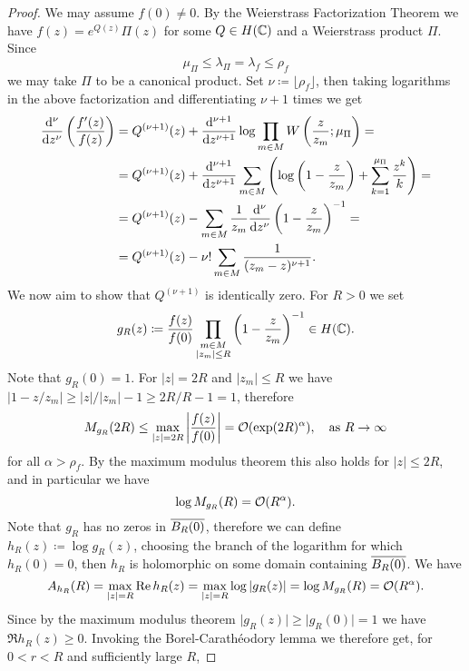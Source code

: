 \begin{proof}
    We may assume $f(0) \neq 0$. By the Weierstrass Factorization Theorem we have $f(z) = e^{Q(z)} \Pi(z)$ for some $Q \in H(\mathbb{C})$ and a Weierstrass product $\Pi$. Since
    $$ \mu_\Pi \leq \lambda_\Pi = \lambda_f \leq \rho_f $$
    we may take $\Pi$ to be a canonical product. Set $\nu \coloneqq \lfloor \rho_f \rfloor$, then taking logarithms in the above factorization and differentiating $\nu + 1$ times we get
    \begin{align*}
        \frac{\mathrm{d}^{\nu}}{\mathrm{d} {z}^{\nu}} \left( \frac{f'(z)}{f(z)} \right)
        &= Q^{(\nu+1)}(z) + \frac{\mathrm{d}^{\nu + 1}}{\mathrm{d} {z}^{\nu + 1}} \log \prod_{m \in M} W \left( \frac{z}{z_m}; \mu_\Pi \right) = \\
        &= Q^{(\nu+1)}(z) + \frac{\mathrm{d}^{\nu + 1}}{\mathrm{d} {z}^{\nu + 1}} \sum_{m \in M} \left( \log \left( 1 - \frac{z}{z_m} \right) + \sum_{k=1}^{\mu_\Pi} \frac{z^k}{k} \right) = \\
        &= Q^{(\nu+1)}(z) - \sum_{m \in M} \frac{1}{z_m} \frac{\mathrm{d}^{\nu}}{\mathrm{d} {z}^{\nu}} \left( 1 - \frac{z}{z_m} \right)^{-1} = \\
        &= Q^{(\nu+1)}(z) - \nu! \sum_{m \in M} \frac{1}{(z_m - z)^{\nu + 1}}.
    \end{align*}
    We now aim to show that $Q^{(\nu + 1)}$ is identically zero. For $R > 0$ we set
    $$ g_R(z) \coloneqq \frac{f(z)}{f(0)} \prod_{\substack{m \in M \\ \vert z_m \vert \leq R}} \left(1 - \frac{z}{z_m} \right)^{-1} \in H(\mathbb{C}). $$
    Note that $g_R(0) = 1$. For $\vert z \vert = 2R$ and $\vert z_m \vert \leq R$ we have $\vert 1 - z / z_m \vert \geq \vert z \vert / \vert z_m \vert - 1 \geq 2R/R - 1 = 1$, therefore
    $$ M_{g_R}(2R) \leq \max_{\vert z \vert = 2R} \left\vert \frac{f(z)}{f(0)} \right\vert = \mathcal{O}(\exp (2R)^\alpha), \quad \textrm{as } R \to \infty $$
    for all $\alpha > \rho_f$. By the maximum modulus theorem this also holds for $\vert z \vert \leq 2R$, and in particular we have
    $$ \log M_{g_R}(R) = \mathcal{O}(R^\alpha). $$
    Note that $g_R$ has no zeros in $\overline{B_R(0)}$, therefore we can define $h_R(z) \coloneqq \log g_R(z)$, choosing the branch of the logarithm for which $h_R(0) = 0$, then $h_R$ is holomorphic on some domain containing $\overline{B_R(0)}$. We have
    $$ A_{h_R}(R) = \max_{\vert z \vert = R} \operatorname{Re} h_R(z) = \max_{\vert z \vert = R} \log \vert g_R(z) \vert = \log M_{g_R}(R) = \mathcal{O}(R^\alpha). $$
    Since by the maximum modulus theorem $\vert g_R(z) \vert \geq \vert g_R(0) \vert = 1$ we have $\Re h_R(z) \geq 0$. Invoking the Borel-Carathéodory lemma we therefore get, for $0 < r < R$ and sufficiently large $R$,

\end{proof}
